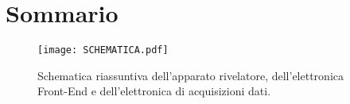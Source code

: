 \section{Sommario}
\begin{figure}[!hbt]
\centering
\texttt{[image: SCHEMATICA.pdf]}
\caption{Schematica riassuntiva dell'apparato rivelatore, dell'elettronica Front-End e dell'elettronica di acquisizioni dati.}
\label{schematica}
\end{figure}